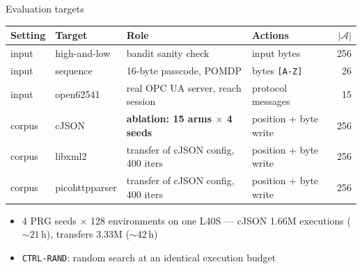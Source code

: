 \documentclass[aspectratio=169,10pt]{beamer}
\newcommand{\code}[1]{\texttt{#1}}
\newcommand{\arm}[1]{\texttt{#1}}
\begin{document}
\begin{frame}{Evaluation targets}
  \centering
  \footnotesize
  \begin{tabular}{@{}llllr@{}}
    \toprule
    Setting & Target & Role & Actions & $|\mathcal{A}|$ \\
    \midrule
    input & high-and-low & bandit sanity check & input bytes & 256 \\
    input & sequence & 16-byte passcode, POMDP & bytes \code{[A-Z]} & 26 \\
    input & open62541 & real OPC UA server, reach session & protocol messages & 15 \\
    \addlinespace
    corpus & cJSON & \textbf{ablation: 15 arms $\times$ 4 seeds} & position + byte write & 256 \\
    corpus & libxml2 & transfer of cJSON config, 400 iters & position + byte write & 256 \\
    corpus & picohttpparser & transfer of cJSON config, 400 iters & position + byte write & 256 \\
    \bottomrule
  \end{tabular}
  \medskip
  \begin{itemize}
    \item 4 PRG seeds $\times$ \num{128} environments on one L40S ---
      cJSON \num{1.66}M executions (${\sim}21$\,h),
      transfers \num{3.33}M (${\sim}42$\,h)
    \item \arm{CTRL-RAND}: random search at an identical execution budget
  \end{itemize}
\end{frame}
\end{document}
